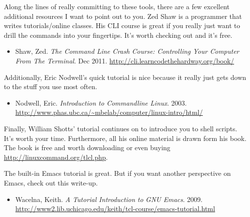 \documentclass[nobib]{tufte-handout}
\begin{document}
Along the lines of really committing to these tools, there are a few excellent additional resources I want to point out to you. Zed Shaw is a programmer that writes tutorials/online classes.  His CLI course is great if you really just want to drill the commands into your fingertips.  It's worth checking out and it's free.
\begin{itemize}
\item Shaw, Zed. \textit{The Command Line Crash Course: Controlling Your Computer From The Terminal}. Dec 2011. \url{http://cli.learncodethehardway.org/book/}
\end{itemize}
Additionally, Eric Nodwell's quick tutorial is nice because it really just gets down to the stuff you use most often.
\begin{itemize}
\item Nodwell, Eric. \textit{Introduction to Commandline Linux}. 2003. \url{http://www.phas.ubc.ca/~mbelab/computer/linux-intro/html/}
\end{itemize}
Finally, William Shotts' tutorial continues on to introduce you to shell scripts. It's worth your time.  Furthermore, all his online material is drawn form his book.  The book is free and worth downloading or even buying \url{http://linuxcommand.org/tlcl.php}.

The built-in Emacs tutorial is great. But if you want another perspective on Emacs, check out this write-up.
\begin{itemize}
\item Wacelna, Keith. \textit{A Tutorial Introduction to GNU Emacs}. 2009. \url{http://www2.lib.uchicago.edu/keith/tcl-course/emacs-tutorial.html}
\end{itemize}
\end{document}
